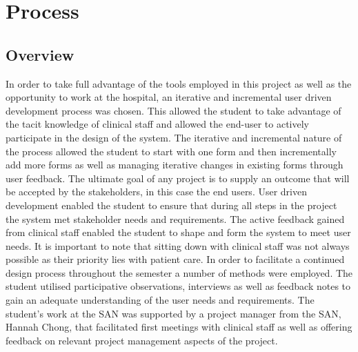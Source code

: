 \section{Process}
\subsection{Overview}
\label{Overview}
In order to take full advantage of the tools employed in this project as well as the opportunity to work at the hospital, an iterative and incremental user driven development process was chosen. This allowed the student to take advantage of the tacit knowledge of clinical staff and allowed the end-user to actively participate in the design of the system. The iterative and incremental nature of the process allowed the student to start with one form and then incrementally add more forms as well as managing iterative changes in existing forms through user feedback. The ultimate goal of any project is to supply an outcome that will be accepted by the stakeholders, in this case the end users. User driven development enabled the student to ensure that during all steps in the project the system met stakeholder needs and requirements. The active feedback gained from clinical staff enabled the student to shape and form the system to meet user needs. It is important to note that sitting down with clinical staff was not always possible as their priority lies with patient care. In order to facilitate a continued design process throughout the semester a number of methods were employed. The student utilised participative observations, interviews as well as feedback notes to gain an adequate understanding of the user needs and requirements. The student's work at the SAN was supported by a project manager from the SAN, Hannah Chong, that facilitated first meetings with clinical staff as well as offering feedback on relevant project management aspects of the project.

